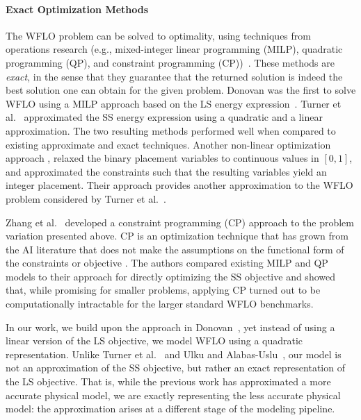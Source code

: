 \documentclass[preprint,12pt]{elsarticle}
\begin{document}
\paragraph{Exact Optimization Methods} 
The WFLO problem can be solved  
to optimality, using
techniques from operations research (e.g., mixed-integer linear programming (MILP), quadratic programming (QP), and constraint programming (CP))~\cite{Zhang2014,turner2014new,donovan2005wind}.
These methods are \emph{exact}, in the sense that they guarantee that the returned solution is indeed
the best solution one can obtain for the given problem. Donovan was the first to solve WFLO using a
MILP approach based on the LS energy expression~\cite{donovan2005wind}. Turner et al.\ \cite{turner2014new} approximated the SS energy expression using a quadratic and a linear approximation. The two resulting methods performed well when
compared to existing approximate and exact techniques.
Another non-linear optimization approach \cite{ulku2019new}, relaxed the binary placement variables to continuous values in $[0,1]$, 
and approximated the constraints such that the resulting variables yield an integer placement.
Their approach provides another approximation to the WFLO problem considered by Turner et al.\ \cite{turner2014new}.

Zhang et al.\ \cite{Zhang2014} developed a constraint programming (CP) approach to the problem variation presented above. CP is an optimization technique that has grown from the AI literature that does not make the assumptions on the functional form of the constraints or objective \cite{rossi2006handbook}. The authors compared existing MILP and QP models to their approach for directly optimizing the SS objective and showed that, while promising for smaller problems, applying CP turned out to be computationally intractable for the larger standard WFLO benchmarks. 


In our work, we build upon the approach in Donovan~\cite{donovan2005wind}, yet instead of using a linear version of the LS objective, we 
model WFLO using a quadratic representation. %
Unlike Turner et al.\ \cite{turner2014new} and Ulku and Alabas-Uslu\ \cite{ulku2019new}, our model is not an approximation of the SS objective, 
but rather an exact representation of the LS objective. That is, while the previous work has approximated a more accurate physical model, we are exactly representing the less accurate physical model: the approximation arises at a different stage of the modeling pipeline.
\end{document}
